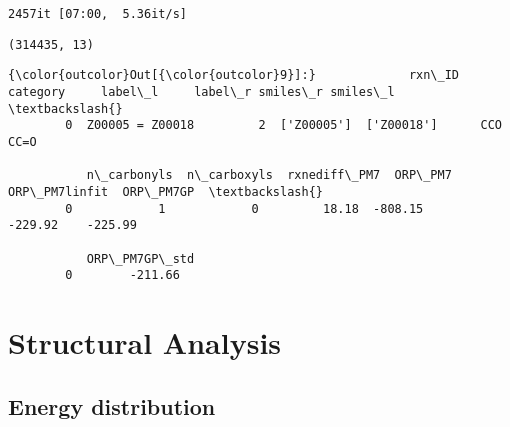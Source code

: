 \documentclass[11pt]{article}
\begin{document}
    \begin{Verbatim}[commandchars=\\\{\}]
2457it [07:00,  5.36it/s]                          

    \end{Verbatim}

    \begin{Verbatim}[commandchars=\\\{\}]
(314435, 13)

    \end{Verbatim}

\begin{Verbatim}[commandchars=\\\{\}]
{\color{outcolor}Out[{\color{outcolor}9}]:}             rxn\_ID  category     label\_l     label\_r smiles\_r smiles\_l  \textbackslash{}
        0  Z00005 = Z00018         2  ['Z00005']  ['Z00018']      CCO     CC=O   
        
           n\_carbonyls  n\_carboxyls  rxnediff\_PM7  ORP\_PM7  ORP\_PM7linfit  ORP\_PM7GP  \textbackslash{}
        0            1            0         18.18  -808.15        -229.92    -225.99   
        
           ORP\_PM7GP\_std  
        0        -211.66  
\end{Verbatim}
            
    \section{Structural Analysis}\label{structural-analysis}

\subsection{Energy distribution}\label{energy-distribution}
\end{document}
